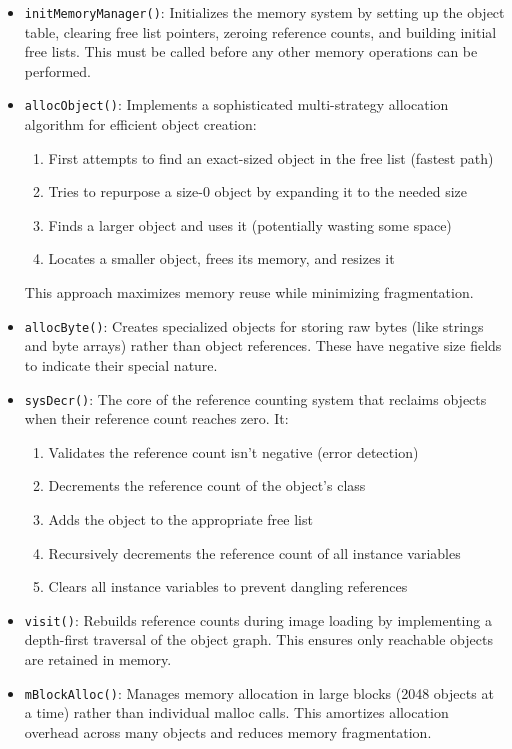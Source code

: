 \documentclass[12pt,a4paper]{report}
\begin{document}
\begin{itemize}
    \item \texttt{initMemoryManager()}: Initializes the memory system by setting up the object table, clearing free list pointers, zeroing reference counts, and building initial free lists. This must be called before any other memory operations can be performed.

    \item \texttt{allocObject()}: Implements a sophisticated multi-strategy allocation algorithm for efficient object creation:
    \begin{enumerate}
        \item First attempts to find an exact-sized object in the free list (fastest path)
        \item Tries to repurpose a size-0 object by expanding it to the needed size
        \item Finds a larger object and uses it (potentially wasting some space)
        \item Locates a smaller object, frees its memory, and resizes it
    \end{enumerate}
    This approach maximizes memory reuse while minimizing fragmentation.

    \item \texttt{allocByte()}: Creates specialized objects for storing raw bytes (like strings and byte arrays) rather than object references. These have negative size fields to indicate their special nature.

    \item \texttt{sysDecr()}: The core of the reference counting system that reclaims objects when their reference count reaches zero. It:
    \begin{enumerate}
        \item Validates the reference count isn't negative (error detection)
        \item Decrements the reference count of the object's class
        \item Adds the object to the appropriate free list
        \item Recursively decrements the reference count of all instance variables
        \item Clears all instance variables to prevent dangling references
    \end{enumerate}

    \item \texttt{visit()}: Rebuilds reference counts during image loading by implementing a depth-first traversal of the object graph. This ensures only reachable objects are retained in memory.

    \item \texttt{mBlockAlloc()}: Manages memory allocation in large blocks (2048 objects at a time) rather than individual malloc calls. This amortizes allocation overhead across many objects and reduces memory fragmentation.
\end{itemize}
\end{document}
